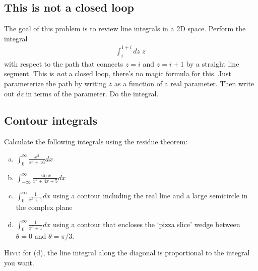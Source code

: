\documentclass[12pt]{article}
\numberwithin{equation}{section}    %
\begin{document}
\subsection{This is not a closed loop}

The goal of this problem is to review line integrals in a 2D space. Perform the integral
\begin{align}
	\int_i^{1+i} dz \; z \,
\end{align}
with respect to the path that connects $z=i$ and $z=i+1$ by a straight line segment. This is \emph{not} a closed loop, there's no magic formula for this. Just parameterize the path by writing $z$ as a function of a real parameter. Then write out $dz$ in terms of the parameter. Do the integral.

\subsection{Contour integrals}

Calculate the following integrals using the residue theorem:
\begin{enumerate}[(a)]
	\item $\displaystyle \int_{0}^\infty \frac{x^2}{x^4 + 16} dx$ %
	\item $\displaystyle \int_{-\infty}^\infty \frac{\sin x}{x^2 + 4x + 5}dx$ %
	\item $\displaystyle \int_{0}^\infty \frac{1}{x^6+1}dx$ using a contour including the real line and a large semicircle in the complex plane %
	\item $\displaystyle \int_{0}^\infty \frac{1}{x^6+1}dx$ using a contour that encloses the `pizza slice' wedge between $\theta = 0$ and $\theta = \pi/3$. 
\end{enumerate}

\textsc{Hint}: for (d), the line integral along the diagonal is proportional to the integral you want. %


%
%
%
%
\end{document}
